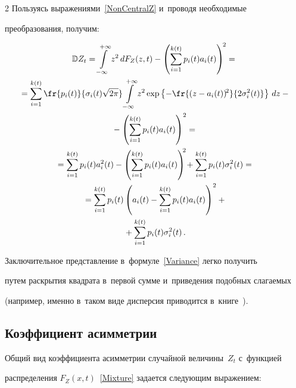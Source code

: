 \begin{multicols}{2}
Пользуясь выражениями~\eqref{NonCentralZ} и~проводя необходимые 

преобразования, получим:

\begin{multline}

\mathbb{D} Z_t=\int\limits_{-\infty}^{+\infty} z^2\,dF_Z(z,t)-\left(

\sum\limits_{i=1}^{k(t)} p_i(t) a_i(t)\right)^{\!2}={}

\\

{}=\sum\limits_{i=1}^{k(t)} \fr{p_i(t)}{\sigma_i(t)\sqrt{2\pi}} 

\int\limits_{-\infty}^{+\infty} z^2\exp\left\{-\fr{(z-a_i(t))^{\!2}}

{2\sigma_i^2(t)}\right\} \,dz-{}\\

{}-\left(\sum_{i=1}^{k(t)} p_i(t) a_i(t)\right)^2={}\\

{}=\sum\limits_{i=1}^{k(t)} p_i(t) a_i^2(t)-\left(\sum\limits_{i=1}^{k(t)} 

p_i(t) a_i(t)\right)^{\!\!2}\!+\sum\limits_{i=1}^{k(t)} p_i(t) \sigma_i^2(t) ={}\\

{}=\sum\limits_{i=1}^{k(t)} p_i(t) \left(a_i(t)-\sum\limits_{i=1}^{k(t)} 

p_i(t) a_i(t)\right)^2+{}\\

{}+\sum_{i=1}^{k(t)} p_i(t) \sigma_i^2(t)\,. 

\label{Variance}

\end{multline}



Заключительное представление в~формуле~\eqref{Variance} легко получить 

путем раскрытия квадрата в~первой сумме и~приведения подобных слагаемых 

(например, именно в~таком виде дисперсия приводится в~книге~\cite{Korolev2011}).



\subsection{Коэффициент асимметрии}



Общий вид коэффициента асимметрии случайной величины~$Z_t$ с~функцией 

распределения $F_Z(x,t)$~\eqref{Mixture} задается следующим выражением:


\end{multicols}
